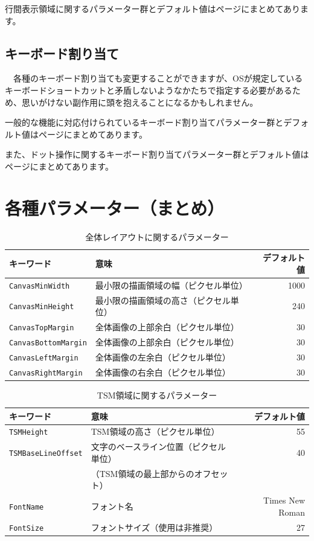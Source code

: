 行間表示領域に関するパラメーター群とデフォルト値は\pageref{DotsAreaParameters}ページにまとめてあります。


\subsection{キーボード割り当て}

　各種のキーボード割り当ても変更することができますが、OSが規定しているキーボードショートカットと矛盾しないようなかたちで指定する必要があるため、思いがけない副作用に頭を抱えることになるかもしれません。

一般的な機能に対応付けられているキーボード割り当てパラメーター群とデフォルト値は\pageref{KeyboardParameters}ページにまとめてあります。

また、ドット操作に関するキーボード割り当てパラメーター群とデフォルト値は\pageref{DotOperationParameters}ページにまとめてあります。


\section{各種パラメーター（まとめ）}

\begin{table}[h]\label{GeneralParameters}
	\centering
	\caption{全体レイアウトに関するパラメーター}
	\smallskip
	\begin{tabular}{llr}
	\hline
	キーワード & 意味 & デフォルト値\\
	\hline
	\hline
	\texttt{CanvasMinWidth} & 最小限の描画領域の幅（ピクセル単位）
	 & 1000\\
	\hline
	\texttt{CanvasMinHeight} & 最小限の描画領域の高さ（ピクセル単位）
	 & 240\\
	\hline
	\texttt{CanvasTopMargin} & 全体画像の上部余白（ピクセル単位）
	 & 30\\
	\hline
	\texttt{CanvasBottomMargin} & 全体画像の上部余白（ピクセル単位）
	 & 30\\
	\hline
	\texttt{CanvasLeftMargin} & 全体画像の左余白（ピクセル単位）
	 & 30\\
	\hline
	\texttt{CanvasRightMargin} & 全体画像の右余白（ピクセル単位）
	 & 30\\
	\hline
	\end{tabular}
\end{table}

\begin{table}[h]\label{TSMParameters}
	\centering
	\caption{TSM領域に関するパラメーター}
	\smallskip
	\begin{tabular}{llr}
	\hline
	キーワード & 意味 & デフォルト値\\
	\hline
	\hline
	\texttt{TSMHeight} & TSM領域の高さ（ピクセル単位）
	 & 55\\
	\hline
	\texttt{TSMBaseLineOffset} & 文字のベースライン位置（ピクセル単位） & 40\\
	& （TSM領域の最上部からのオフセット） & \\
	\hline
	\texttt{FontName} & フォント名
	 & Times New Roman\\
	\hline
	\texttt{FontSize} & フォントサイズ（使用は非推奨）
	 & 27\\
	\hline
	\end{tabular}
\end{table}

